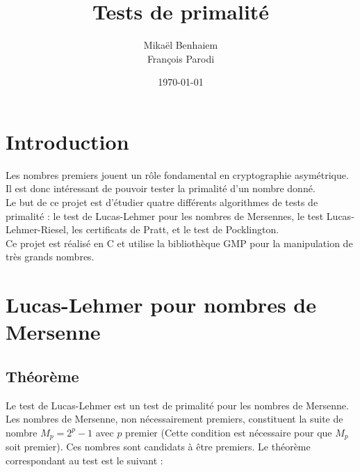\documentclass[a4paper]{article}
\begin{document}
\lstset{language=C,
	breaklines=true,
	basicstyle=\ttfamily
	}

\title{Tests de primalité}
\author{Mikaël Benhaiem\\
François Parodi}
\date{\today}

\renewcommand{\labelitemi}{$\bullet$}

\newtheorem{theorem}{Theorem}[section]

\maketitle

\newpage

\tableofcontents

\newpage

\section*{Introduction}

Les nombres premiers jouent un rôle fondamental en cryptographie asymétrique.
Il est donc intéressant de pouvoir tester la primalité d'un nombre donné.\\

Le but de ce projet est d'étudier quatre différents algorithmes de tests
de primalité : le test de Lucas-Lehmer pour les nombres de Mersennes, le test
Lucas-Lehmer-Riesel, les certificats de Pratt, et le test de Pocklington.\\

Ce projet est réalisé en C et utilise la bibliothèque GMP pour la manipulation
de très grands nombres.

\newpage

\section{Lucas-Lehmer pour nombres de Mersenne}

\subsection{Théorème}

Le test de Lucas-Lehmer est un test de primalité pour les nombres de Mersenne.
Les nombres de Mersenne, non nécessairement premiers, constituent la suite
de nombre $M_p = 2^p - 1$ avec $p$ premier (Cette condition est nécessaire
pour que $M_p$ soit premier). Ces nombres sont candidats à être premiers.
Le théorème correspondant au test est le suivant : 
\end{document}
